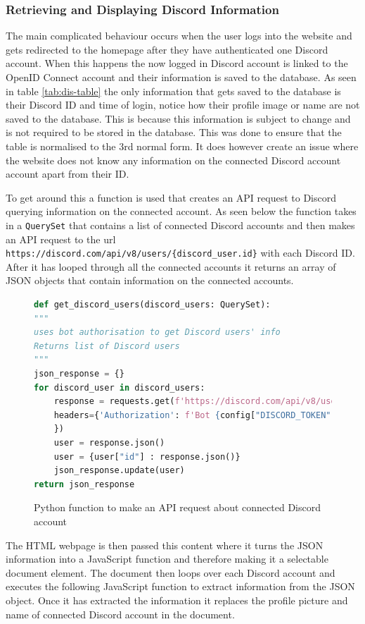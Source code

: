 \subsubsection{Retrieving and Displaying Discord Information}
The main complicated behaviour occurs when the user logs into the website and gets redirected to the homepage after they have authenticated one Discord account. When this happens the now logged in Discord account is linked to the OpenID Connect account and their information is saved to the database. As seen in table \ref{tab:dis-table} the only information that gets saved to the database is their Discord ID and time of login, notice how their profile image or name are not saved to the database. This is because this information is subject to change and is not required to be stored in the database. This was done to ensure that the table is normalised to the 3rd normal form. It does however create an issue where the website does not know any information on the connected Discord account account apart from their ID. 

To get around this a function is used that creates an API request to Discord querying information on the connected account. As seen below the function takes in a \verb|QuerySet| that contains a list of connected Discord accounts and then makes an API request to the url \verb|https://discord.com/api/v8/users/{discord_user.id}| with each Discord ID. After it has looped through all the connected accounts it returns an array of JSON objects that contain information on the connected accounts.

\begin{figure}[H]
\begin{lstlisting}[language=Python]
def get_discord_users(discord_users: QuerySet):
"""
uses bot authorisation to get Discord users' info
Returns list of Discord users
"""
json_response = {}
for discord_user in discord_users:
	response = requests.get(f'https://discord.com/api/v8/users/{discord_user.id}', 
	headers={'Authorization': f'Bot {config["DISCORD_TOKEN"]}'
	})
	user = response.json()
	user = {user["id"] : response.json()}
	json_response.update(user)
return json_response
\end{lstlisting}
\caption{Python function to make an API request about connected Discord account}
\label{fig:django-js-json}
\end{figure}

The HTML webpage is then passed this content where it turns the JSON information into a JavaScript function and therefore making it a selectable document element. The document then loops over each Discord account and executes the following JavaScript function to extract information from the JSON object. Once it has extracted the information it replaces the profile picture and name of connected Discord account in the document.

